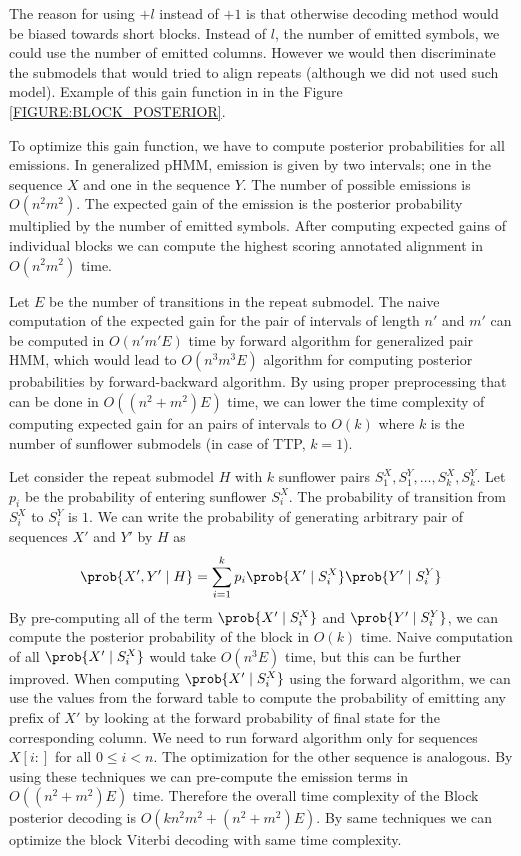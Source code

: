 The reason for using $+l$ instead of $+1$ is that otherwise decoding method
would be biased towards short blocks. Instead of $l$, the number of emitted
symbols, we could use the number of emitted columns. However we would then
discriminate the submodels that would tried to align repeats (although we did
not used such model). Example of this gain function in in the Figure
\ref{FIGURE:BLOCK_POSTERIOR}.

To optimize this gain function, we have to compute posterior probabilities for
all emissions. In generalized pHMM, emission is given by two intervals; one in the
sequence $X$ and one in the sequence $Y$. The number of possible emissions is
$O(n^2m^2)$. The expected gain of the emission is the posterior probability
multiplied by the number of emitted symbols. After computing expected gains of
individual blocks we can compute the highest scoring annotated alignment in
$O(n^2m^2)$ time.

Let $E$ be the number of transitions in the repeat submodel. The naive
computation of the expected gain for the pair of intervals of length $n'$ and
$m'$ can be computed in $O(n'm'E)$ time by forward algorithm for generalized
pair HMM, which would lead to $O(n^3m^3E)$ algorithm for computing posterior
probabilities by forward-backward algorithm. By using proper preprocessing that
can be done in $O((n^2+m^2)E)$ time, we can lower the time complexity of
computing expected gain for an pairs of intervals to $O(k)$ where $k$ is the
number of sunflower submodels (in case of TTP, $k=1$).

Let consider the repeat submodel $H$ with $k$ sunflower pairs $S^X_1, S^Y_1,
\dots, S^X_k, S^Y_k$. Let $p_i$ be the probability of entering sunflower
$S^X_i$.  The probability of transition from $S^X_i$ to $S^Y_i$ is $1$. We can
write the probability of generating arbitrary pair of sequences $X'$ and $Y'$ by $H$ as
\begin{equation}
\prob{X', Y'\mid H} = \sum_{i=1}^k p_i\prob{X'\mid S^X_i}\prob{Y'\mid S^Y_i}
\end{equation}
By pre-computing all of the term $\prob{X'\mid S^X_i}$ and $\prob{Y'\mid
S^Y_i}$, we can compute the posterior probability of the block in $O(k)$ time.
Naive computation of all $\prob{X'\mid S^X_i}$ would take $O(n^3E)$ time, but
this can be further improved. When computing $\prob{X'\mid S^X_i}$ using the
forward algorithm, we can use the values from the forward table to compute the
probability of emitting any prefix of $X'$ by looking at the forward
probability of final state for the corresponding column. We need to run forward
algorithm only for sequences $X[i:]$ for all $0\leq i< n$. The optimization for
the other sequence is analogous. By using these techniques we can pre-compute
the emission terms in $O((n^2+m^2)E)$ time. Therefore the overall time
complexity of the Block posterior decoding is $O(kn^2m^2 + (n^2+m^2)E)$. By
same techniques we can optimize the block Viterbi decoding with same time
complexity.

